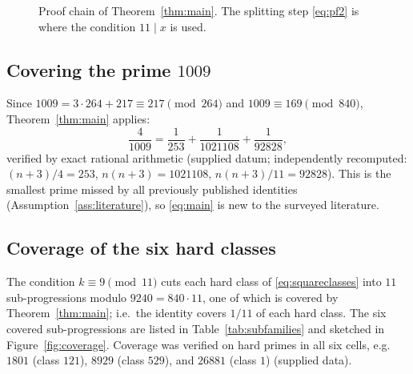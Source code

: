 \documentclass[11pt,a4paper]{article}
\theoremstyle{definition}
\begin{document}
\begin{figure}[t]
  \centering
  \caption{Proof chain of Theorem~\ref{thm:main}. The splitting step
    \eqref{eq:pf2} is where the condition $11 \mid x$ is used.}
  \label{fig:proofchain}
\end{figure}

\subsection{Covering the prime $1009$}

Since $1009 = 3\cdot 264 + 217 \equiv 217 \pmod{264}$ and $1009 \equiv 169
\pmod{840}$, Theorem~\ref{thm:main} applies:
\begin{equation}
  \label{eq:1009}
  \frac{4}{1009} = \frac{1}{253} + \frac{1}{1021108} + \frac{1}{92828},
\end{equation}
verified by exact rational arithmetic (supplied datum; independently
recomputed: $(n+3)/4 = 253$, $n(n+3) = 1021108$,
$n(n+3)/11 = 92828$). This is the smallest prime missed by all previously
published identities (Assumption~\ref{ass:literature}), so \eqref{eq:main}
is new to the surveyed literature.

\subsection{Coverage of the six hard classes}

The condition $k \equiv 9 \pmod{11}$ cuts each hard class of
\eqref{eq:squareclasses} into $11$ sub-progressions modulo
$9240 = 840 \cdot 11$, one of which is covered by Theorem~\ref{thm:main};
i.e.\ the identity covers $1/11$ of each hard class. The six covered
sub-progressions are listed in Table~\ref{tab:subfamilies} and sketched in
Figure~\ref{fig:coverage}. Coverage was verified on hard primes in all six
cells, e.g.\ $1801$ (class $121$), $8929$ (class $529$), and $26881$
(class $1$) (supplied data).
\end{document}
